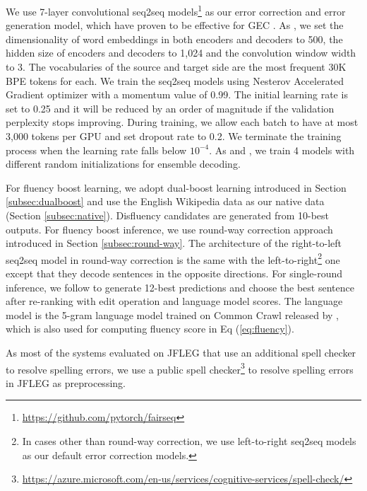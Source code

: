 \documentclass{article} %
\begin{document}
We use 7-layer convolutional seq2seq models\footnote{\url{https://github.com/pytorch/fairseq}} \citep{gehring2017convolutional} as our error correction and error generation model, which have proven to be effective for GEC \citep{chollampatt2018}. As \cite{chollampatt2018}, we set the dimensionality of word embeddings in both encoders and decoders to 500, the hidden size of encoders and decoders to 1,024 and the convolution window width to 3. The vocabularies of the source and target side are the most frequent 30K BPE tokens for each. We train the seq2seq models using Nesterov Accelerated Gradient \citep{sutskever2013importance} optimizer with a momentum
value of 0.99. The initial learning rate is set to 0.25 and it will be reduced by an order of magnitude if the validation perplexity stops
improving. During training, we allow each batch to have at most 3,000 tokens per GPU and set dropout rate to 0.2. We terminate the training process when the learning rate falls below $10^{-4}$. As \cite{chollampatt2018} and \cite{grundkiewicz2018near}, we train 4 models with different random initializations for ensemble decoding.

For fluency boost learning, we adopt dual-boost learning introduced in Section \ref{subsec:dualboost} and use the English Wikipedia data as our native data (Section \ref{subsec:native}). Disfluency candidates are generated from 10-best outputs. For fluency boost inference, we use round-way correction approach introduced in Section \ref{subsec:round-way}. The architecture of the right-to-left seq2seq model in round-way correction is the same with the left-to-right\footnote{In cases other than round-way correction, we use left-to-right seq2seq models as our default error correction models.} one except that they decode sentences in the opposite directions. For single-round inference, we follow \cite{chollampatt2018} to generate 12-best predictions and choose the best sentence after re-ranking with edit operation and language model scores. The language model is the 5-gram language model trained on Common Crawl released by \cite{junczys2016phrase}, which is also used for computing fluency score in Eq (\ref{eq:fluency}).

As most of the systems \citep{sakaguchi2017grammatical,chollampatt2018,grundkiewicz2018near} evaluated on JFLEG that use an additional spell checker to resolve spelling errors, we use a public spell checker\footnote{\url{https://azure.microsoft.com/en-us/services/cognitive-services/spell-check/}} to resolve spelling errors in JFLEG as preprocessing.%
\end{document}
